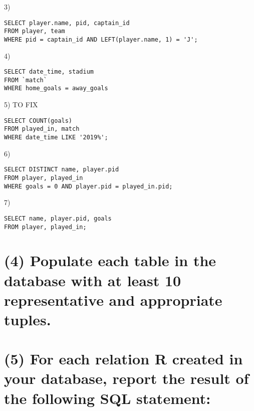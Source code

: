 \documentclass{article}
\begin{document}
3)
\begin{lstlisting}
SELECT player.name, pid, captain_id
FROM player, team
WHERE pid = captain_id AND LEFT(player.name, 1) = 'J';
\end{lstlisting}{}

\pagebreak

4)
\begin{lstlisting}
SELECT date_time, stadium
FROM `match`
WHERE home_goals = away_goals
\end{lstlisting}{}

5) TO FIX
\begin{lstlisting}
SELECT COUNT(goals)
FROM played_in, match
WHERE date_time LIKE '2019%';
\end{lstlisting}{}

6)
\begin{lstlisting}
SELECT DISTINCT name, player.pid
FROM player, played_in
WHERE goals = 0 AND player.pid = played_in.pid;
\end{lstlisting}{}

7)
\begin{lstlisting}
SELECT name, player.pid, goals
FROM player, played_in;
\end{lstlisting}{}

\section{(4) Populate each table in the database with at least 10 representative and appropriate tuples. }

\section{(5) For each relation R created in your database, report the result of the following SQL statement:}
\end{document}
